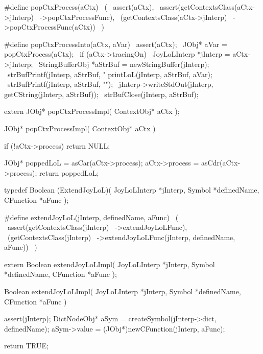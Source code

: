 \startCHeader
#define popCtxProcess(aCtx)                    \
  (                                            \
    assert(aCtx),                              \
    assert(getContextsClass(aCtx->jInterp)     \
      ->popCtxProcessFunc),                    \
    (getContextsClass(aCtx->jInterp)           \
      ->popCtxProcessFunc(aCtx))               \
  )

#define popCtxProcessInto(aCtx, aVar)                           \
assert(aCtx);                                                   \
JObj* aVar = popCtxProcess(aCtx);                           \
if (aCtx->tracingOn) {                                          \
  JoyLoLInterp *jInterp = aCtx->jInterp;                        \
  StringBufferObj *aStrBuf = newStringBuffer(jInterp);          \
  strBufPrintf(jInterp, aStrBuf, "%
  printLoL(jInterp, aStrBuf, aVar);                             \
  strBufPrintf(jInterp, aStrBuf, "\n");                         \
  jInterp->writeStdOut(jInterp, getCString(jInterp, aStrBuf));  \
  strBufClose(jInterp, aStrBuf);                                \
}
\stopCHeader

\setCHeaderStream{private}
\startCHeader
extern JObj* popCtxProcessImpl(
  ContextObj* aCtx
);
\stopCHeader
\setCHeaderStream{public}

\startCCode
JObj* popCtxProcessImpl(
  ContextObj* aCtx
) {
  if (!aCtx->process) return NULL;

  JObj* poppedLoL = asCar(aCtx->process);
  aCtx->process       = asCdr(aCtx->process);
  return poppedLoL;
}
\stopCCode

\startCHeader
typedef Boolean (ExtendJoyLoL)(
  JoyLoLInterp *jInterp,
  Symbol       *definedName,
  CFunction    *aFunc
);

#define extendJoyLoL(jInterp, definedName, aFunc)       \
  (                                                     \
    assert(getContextsClass(jInterp)                    \
      ->extendJoyLoLFunc),                              \
    (getContextsClass(jInterp)                          \
      ->extendJoyLoLFunc(jInterp, definedName, aFunc))  \
  )
\stopCHeader

\startCHeader
extern Boolean extendJoyLoLImpl(
  JoyLoLInterp *jInterp,
  Symbol       *definedName,
  CFunction    *aFunc
);
\stopCHeader
\setCHeaderStream{public}

\startCCode
Boolean extendJoyLoLImpl(
  JoyLoLInterp *jInterp,
  Symbol       *definedName,
  CFunction    *aFunc
) {
  assert(jInterp);
  DictNodeObj* aSym =
    createSymbol(jInterp->dict, definedName);
  aSym->value =
    (JObj*)newCFunction(jInterp, aFunc);

  return TRUE;
}
\stopCCode

